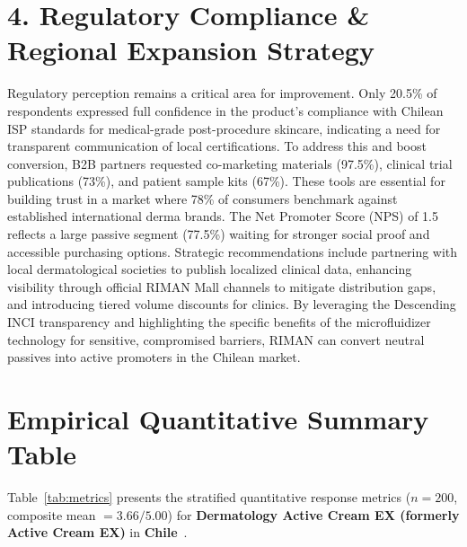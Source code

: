 \documentclass[10pt,twocolumn,a4paper]{article}
\begin{document}
\section{4. Regulatory Compliance \& Regional Expansion Strategy}
Regulatory perception remains a critical area for improvement. Only 20.5\% of respondents expressed full confidence in the product's compliance with Chilean ISP standards for medical-grade post-procedure skincare, indicating a need for transparent communication of local certifications. To address this and boost conversion, B2B partners requested co-marketing materials (97.5\%), clinical trial publications (73\%), and patient sample kits (67\%). These tools are essential for building trust in a market where 78\% of consumers benchmark against established international derma brands. The Net Promoter Score (NPS) of 1.5 reflects a large passive segment (77.5\%) waiting for stronger social proof and accessible purchasing options. Strategic recommendations include partnering with local dermatological societies to publish localized clinical data, enhancing visibility through official RIMAN Mall channels to mitigate distribution gaps, and introducing tiered volume discounts for clinics. By leveraging the Descending INCI transparency and highlighting the specific benefits of the microfluidizer technology for sensitive, compromised barriers, RIMAN can convert neutral passives into active promoters in the Chilean market.


\section{Empirical Quantitative Summary Table}
Table~\ref{tab:metrics} presents the stratified quantitative response metrics ($n = 200$, composite mean $= 3.66/5.00$) for \textbf{Dermatology Active Cream EX (formerly Active Cream EX)} in \textbf{Chile}~\cite{ref_kaggle_doi,ref_hf_doi}.
\end{document}
